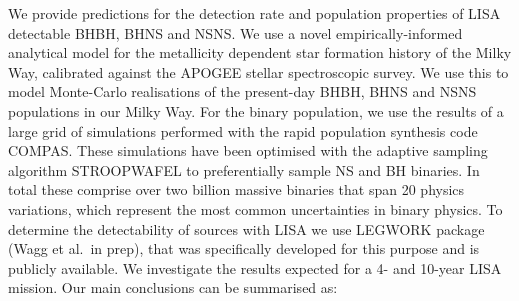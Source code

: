 We provide predictions for the detection rate and population properties of LISA detectable BHBH, BHNS and NSNS.
%
We use a novel empirically-informed analytical model for the metallicity dependent star formation history of the Milky Way, calibrated against the APOGEE stellar spectroscopic survey. We use this to model Monte-Carlo realisations of the present-day BHBH, BHNS and NSNS populations in our Milky Way. 
%
For the binary population, we use the results of a large grid of simulations performed with the rapid population synthesis code COMPAS. These simulations have been optimised with the adaptive sampling algorithm STROOPWAFEL to preferentially sample NS and BH binaries. In total these comprise over two billion massive binaries that span 20 physics variations, which represent the most common uncertainties in binary physics.
%
To determine the detectability of sources with LISA we use LEGWORK package (Wagg et al.\ in prep), that was specifically developed for this purpose and is publicly available. 
%
We investigate the results expected for a 4- and 10-year LISA mission. Our main conclusions can be summarised as:

